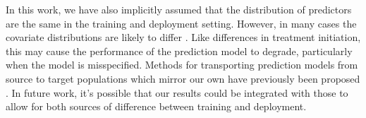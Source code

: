 In this work, we have also implicitly assumed that the distribution of predictors are the same in the training and deployment setting. However, in many cases the covariate distributions are likely to differ \cite{bickel_discriminative_2009,sugiyama_covariate_2007}. Like differences in treatment initiation, this may cause the performance of the prediction model to degrade, particularly when the model is misspecified. Methods for transporting prediction models from source to target populations which mirror our own have previously been proposed \cite{steingrimsson_extending_2022,steingrimsson_transporting_2021,li_estimating_2022,morrison_robust_2022}. In future work, it's possible that our results could be integrated with those to allow for both sources of difference between training and deployment.

